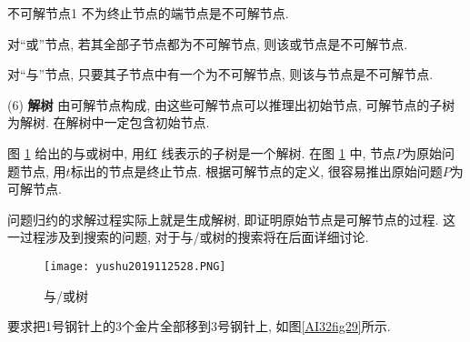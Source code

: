 \begin{mydef}{不可解节点}{1}
 不为终止节点的端节点是不可解节点.

 对“或”节点, 若其全部子节点都为不可解节点, 则该或节点是不可解节点.

 对“与”节点, 只要其子节点中有一个为不可解节点, 则该与节点是不可解节点.
\end{mydef}

(6) \textbf{解树} 由可解节点构成, 由这些可解节点可以推理出初始节点, 可解节点的子树为解树. 在解树中一定包含初始节点.
\begin{example}
    图 \ref{AI32fig28} 给出的与或树中, 用红 线表示的子树是一个解树. 在图 \ref{AI32fig28} 中, 节点$P$为原始问题节点, 用$t$标出的节点是终止节点. 根据可解节点的定义, 很容易推出原始问题$P$为可解节点.
\end{example}
\begin{remark}
    问题归约的求解过程实际上就是生成解树, 即证明原始节点是可解节点的过程. 这一过程涉及到搜索的问题, 对于与/或树的搜索将在后面详细讨论.
\end{remark}
\begin{figure}[H]
    \centering
    \texttt{[image: yushu2019112528.PNG]}
    \caption{与/或树 }
    \label{AI32fig28}
\end{figure}
\begin{example}
     要求把1号钢针上的3个金片全部移到3号钢针上, 如图\ref{AI32fig29}所示.
\end{example}
